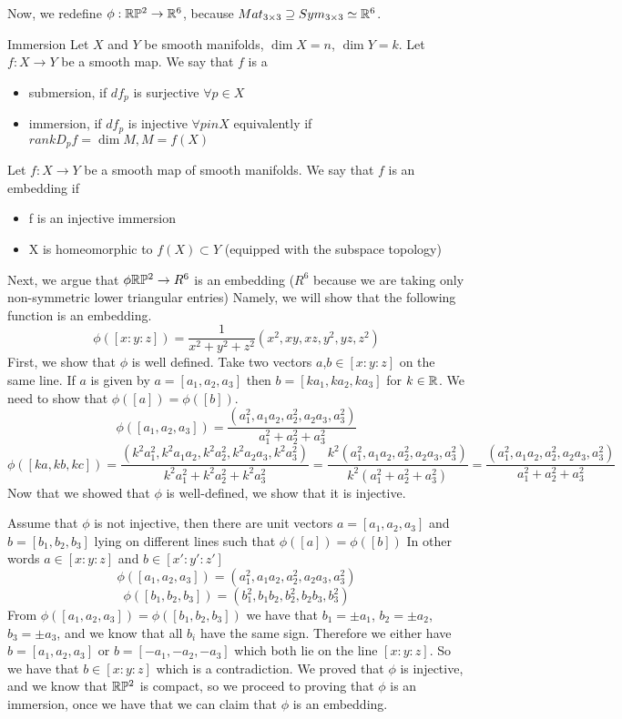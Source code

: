 \documentclass[11pt,a4paper]{report}
\begin{document}
Now, we redefine $\phi: \mathbb{R} \mathbb{P} ^2 \to \mathbb{R}^6$, because  $Mat_{3 \times 3} \supseteq Sym_{3 \times 3} \simeq \mathbb{R}^6$.
\begin{defn}{Immersion}
Let $X$ and $Y$ be smooth manifolds, $\dim X =n $, $\dim Y = k$. Let $f : X \to Y$ be a smooth map.
We say that $f$ is a
\begin{itemize}
    \item submersion, if $df_p$ is surjective $\forall p \in X$
    \item immersion, if $df_p$ is injective $\forall p in X$ equivalently if $rank D_p f = \dim M, M=f(X)$
\end{itemize}
\end{defn}
\begin{defn}
    Let $f: X \to Y$ be a smooth map of smooth manifolds. We say that $f$ is an embedding if 
    \begin{itemize}
        \item f is an injective immersion
        \item X is homeomorphic to $f(X) \subset Y$ (equipped with the subspace topology)
    \end{itemize}
\end{defn}
Next, we argue that $\phi \mathbb{R} \mathbb{P} ^2 \to R^6$ is an embedding ($R^6$ because we are taking only non-symmetric lower triangular entries)
Namely, we will show that the following function is an embedding.
$$ \phi([x:y:z]) = \frac{1}{x^2+y^2+z^2} (x^2,xy, xz, y^2, yz, z^2) $$
First, we show that $\phi$ is well defined. Take two vectors $a$,$b \in [x:y:z]$ on the same line.
If $a$ is given by $a=[a_1,a_2,a_3]$ then $b = [k a_1, k a_2, k a_3]$ for $k \in \mathbb{R}$. We need to show that 
$\phi([a]) = \phi([b])$.
$$\phi([a_1,a_2,a_3]) = \frac{(a_1^2, a_1a_2, a_2^2, a_2a_3, a_3^2)}{a_1^2+a_2^2+a_3^2}$$
$$\phi([ka,kb,kc]) = 
\frac{(k^2 a_1^2, k^2 a_1a_2, k^2 a_2^2, k^2 a_2a_3, k^2 a_3^2)}{k^2 a_1^2+ k^2 a_2^2+ k^2 a_3^2} 
=  \frac{ k^2 (a_1^2, a_1 a_2, a_2^2, a_2a_3, a_3^2) }{ k^2 (a_1^2+a_2^2+a_3^2)  }
= \frac{(a_1^2, a_1a_2, a_2^2, a_2a_3, a_3^2)}{a_1^2+a_2^2+a_3^2} $$
Now that we showed that $\phi$ is well-defined, we show that it is injective.

Assume that $\phi$ is not injective, then there are unit vectors $a = [a_1,a_2,a_3]$ and $b=[b_1,b_2,b_3]$ lying on different lines 
such that $\phi([a]) = \phi([b])$ 
In other words $a \in [x:y:z]$  and $b \in [x\prime:y\prime:z\prime]$
$$\phi([a_1,a_2,a_3]) = (a_1^2, a_1a_2, a_2^2, a_2a_3, a_3^2)$$
$$\phi([b_1,b_2,b_3]) = (b_1^2, b_1b_2, b_2^2, b_2b_3, b_3^2)$$
From $\phi([a_1,a_2,a_3]) = \phi([b_1,b_2,b_3])$ we have that $b_1 = \pm a_1$, $b_2 = \pm a_2$, $b_3 = \pm a_3$, and we know that all $b_i$ have the same sign.
Therefore  we either have $b = [a_1, a_2, a_3]$ or $b = [-a_1, -a_2,-a_3]$ which both lie on the line $[x:y:z]$. So we have that $b \in [x:y:z]$ which is a contradiction.
\newline
We proved that $\phi$ is injective, and we know that $\mathbb{R} \mathbb{P} ^2$ is compact, so we proceed to proving that $\phi$ is an immersion, 
once we have that we can claim that $\phi$ is an embedding.
\newline
\end{document}
